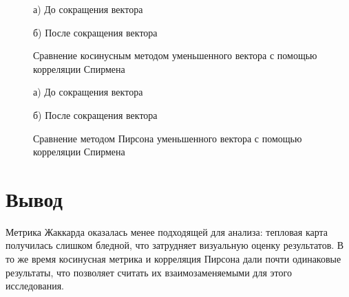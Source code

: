 \begin{figure}[H]
    \begin{minipage}[H]{0.5\linewidth}
        а) До сокращения вектора 
    \end{minipage}
    \begin{minipage}[H]{0.5\linewidth}
        б) После сокращения вектора 
    \end{minipage}
    \caption{Сравнение косинусным методом уменьшенного вектора с помощью корреляции Спирмена}
    \label{fig:heatmapSpearCos}
\end{figure}

\begin{figure}[H]
    \begin{minipage}[H]{0.5\linewidth}
        а) До сокращения вектора 
    \end{minipage}
    \begin{minipage}[H]{0.5\linewidth}
        б) После сокращения вектора 
    \end{minipage}
    \caption{Сравнение методом Пирсона уменьшенного вектора с помощью корреляции Спирмена}
    \label{fig:heatmapSpearPear}
\end{figure}

\section{Вывод}

Метрика Жаккарда оказалась менее подходящей для анализа: тепловая карта получилась слишком бледной, 
что затрудняет визуальную оценку результатов. В то же время косинусная метрика и корреляция Пирсона дали почти одинаковые результаты, 
что позволяет считать их взаимозаменяемыми для этого исследования.

\clearpage
